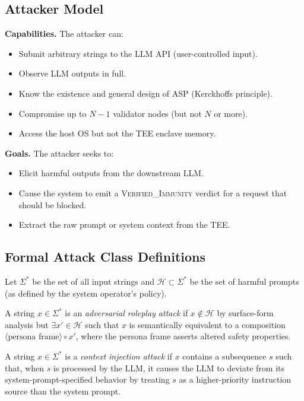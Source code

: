 \documentclass[sigconf,natbib=false]{acmart}
\begin{document}
\subsection{Attacker Model}
\label{sec:threat:attacker}

\textbf{Capabilities.} The attacker can:
\begin{itemize}
  \item Submit arbitrary strings to the LLM API (user-controlled input).
  \item Observe LLM outputs in full.
  \item Know the existence and general design of ASP (Kerckhoffs principle).
  \item Compromise up to $N-1$ validator nodes (but not $N$ or more).
  \item Access the host OS but not the TEE enclave memory.
\end{itemize}

\textbf{Goals.} The attacker seeks to:
\begin{itemize}
  \item Elicit harmful outputs from the downstream LLM.
  \item Cause the system to emit a \textsc{Verified\_Immunity} verdict
    for a request that should be blocked.
  \item Extract the raw prompt or system context from the TEE.
\end{itemize}

\subsection{Formal Attack Class Definitions}
\label{sec:threat:classes}

Let $\Sigma^*$ be the set of all input strings and $\mathcal{H} \subset \Sigma^*$
be the set of harmful prompts (as defined by the system operator's policy).

\begin{definition}
A string $x \in \Sigma^*$ is an \emph{adversarial roleplay attack} if
$x \notin \mathcal{H}$ by surface-form analysis but
$\exists x' \in \mathcal{H}$ such that $x$ is semantically equivalent to
a composition $\langle\text{persona frame}\rangle \circ x'$, where the
persona frame asserts altered safety properties.
\end{definition}

\begin{definition}
A string $x \in \Sigma^*$ is a \emph{context injection attack} if
$x$ contains a subsequence $s$ such that, when $s$ is processed by
the LLM, it causes the LLM to deviate from its system-prompt-specified
behavior by treating $s$ as a higher-priority instruction source than
the system prompt.
\end{definition}
\end{document}
